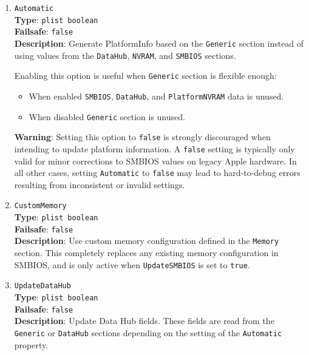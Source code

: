 \documentclass[]{article}
\providecommand{\tightlist}{%
  \setlength{\itemsep}{0pt}\setlength{\parskip}{0pt}}
\begin{document}
\begin{enumerate}
\item
  \texttt{Automatic}\\
  \textbf{Type}: \texttt{plist\ boolean}\\
  \textbf{Failsafe}: \texttt{false}\\
  \textbf{Description}: Generate PlatformInfo based on the \texttt{Generic}
  section instead of using values from the \texttt{DataHub}, \texttt{NVRAM},
  and \texttt{SMBIOS} sections.

  Enabling this option is useful when \texttt{Generic} section is flexible
  enough:
  \begin{itemize}
  \tightlist
  \item When enabled \texttt{SMBIOS}, \texttt{DataHub}, and
  \texttt{PlatformNVRAM} data is unused.
  \item When disabled \texttt{Generic} section is unused.
  \end{itemize}

  \textbf{Warning}: Setting this option to \texttt{false} is strongly discouraged when
  intending to update platform information. A \texttt{false} setting is typically only
  valid for minor corrections to SMBIOS values on legacy Apple hardware. In all other
  cases, setting \texttt{Automatic} to \texttt{false} may lead to hard-to-debug errors
  resulting from inconsistent or invalid settings.

\item
  \texttt{CustomMemory}\\
  \textbf{Type}: \texttt{plist\ boolean}\\
  \textbf{Failsafe}: \texttt{false}\\
  \textbf{Description}: Use custom memory configuration defined in the
  \texttt{Memory} section. This completely replaces any existing memory
  configuration in SMBIOS, and is only active when \texttt{UpdateSMBIOS}
  is set to \texttt{true}.

\item
  \texttt{UpdateDataHub}\\
  \textbf{Type}: \texttt{plist\ boolean}\\
  \textbf{Failsafe}: \texttt{false}\\
  \textbf{Description}: Update Data Hub fields. These fields are read
  from the \texttt{Generic} or \texttt{DataHub} sections depending on
  the setting of the \texttt{Automatic} property.


\end{enumerate}
\end{document}
